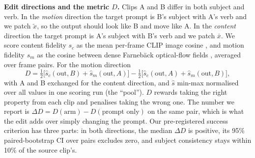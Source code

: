 \documentclass[twoside,english]{article}
\newcommand{\xs}{\bar{x}}         %
\newcommand{\xd}{\tilde{x}}       %
\newcommand{\dD}{\Delta D}
\begin{document}
\textbf{Edit directions and the metric $D$.} Clips A and B differ in both subject and verb. In the
\emph{motion} direction the target prompt is B's subject with A's verb and we patch $\xd$, so the output
should look like B and move like A. In the \emph{content} direction the target prompt is A's subject with
B's verb and we patch $\xs$. We score content fidelity $s_c$ as the mean per-frame CLIP image cosine
\citep{radford2021clip}, and motion fidelity $s_m$ as the cosine between dense Farneb\"ack optical-flow
fields \citep{farneback2003}, averaged over frame pairs. For the motion direction
\begin{equation}
D = \tfrac12\big[\hat s_c(\text{out},B) + \hat s_m(\text{out},A)\big] - \tfrac12\big[\hat s_c(\text{out},A) + \hat s_m(\text{out},B)\big], \label{eq:D}
\end{equation}
with A and B exchanged for the content direction, and $\hat s$ min-max normalised over all values in one
scoring run (the ``pool''). $D$ rewards taking the right property from each clip and penalises taking
the wrong one. The number we report is $\dD = D(\text{arm}) - D(\text{prompt only})$ on the same pair,
which is what the edit adds over simply changing the prompt. Our pre-registered success criterion has
three parts: in both directions, the median $\dD$ is positive, its 95\% paired-bootstrap CI over pairs
excludes zero, and subject consistency stays within 10\% of the source clip's.
\end{document}

